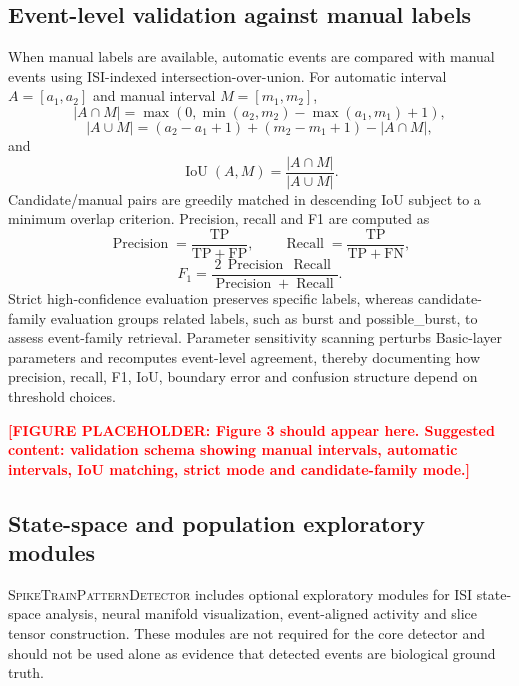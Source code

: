 \documentclass[pdflatex,sn-apa]{sn-jnl}
\newcommand{\stpd}{\textsc{SpikeTrainPatternDetector}}
\newcommand{\TODOFIG}[1]{\par\medskip\noindent\textbf{\textcolor{red}{[FIGURE PLACEHOLDER: #1]}}\par\medskip}
\begin{document}
\subsection{Event-level validation against manual labels}

When manual labels are available, automatic events are compared with manual events using ISI-indexed intersection-over-union. For automatic interval $A=[a_1,a_2]$ and manual interval $M=[m_1,m_2]$,
\begin{equation}
    |A\cap M|
    =
    \max\left(0,\min(a_2,m_2)-\max(a_1,m_1)+1\right),
\end{equation}
\begin{equation}
    |A\cup M|
    =
    (a_2-a_1+1)+(m_2-m_1+1)-|A\cap M|,
\end{equation}
and
\begin{equation}
    \operatorname{IoU}(A,M)
    =
    \frac{|A\cap M|}{|A\cup M|}.
\end{equation}
Candidate/manual pairs are greedily matched in descending IoU subject to a minimum overlap criterion. Precision, recall and F1 are computed as
\begin{equation}
    \operatorname{Precision}
    =
    \frac{\mathrm{TP}}{\mathrm{TP}+\mathrm{FP}},
    \qquad
    \operatorname{Recall}
    =
    \frac{\mathrm{TP}}{\mathrm{TP}+\mathrm{FN}},
\end{equation}
\begin{equation}
    F_1 =
    \frac{2\,\operatorname{Precision}\,\operatorname{Recall}}
    {\operatorname{Precision}+\operatorname{Recall}}.
\end{equation}
Strict high-confidence evaluation preserves specific labels, whereas candidate-family evaluation groups related labels, such as burst and possible\_burst, to assess event-family retrieval. Parameter sensitivity scanning perturbs Basic-layer parameters and recomputes event-level agreement, thereby documenting how precision, recall, F1, IoU, boundary error and confusion structure depend on threshold choices.

\TODOFIG{Figure 3 should appear here. Suggested content: validation schema showing manual intervals, automatic intervals, IoU matching, strict mode and candidate-family mode.}

\subsection{State-space and population exploratory modules}

\stpd{} includes optional exploratory modules for ISI state-space analysis, neural manifold visualization, event-aligned activity and slice tensor construction. These modules are not required for the core detector and should not be used alone as evidence that detected events are biological ground truth.
\end{document}
